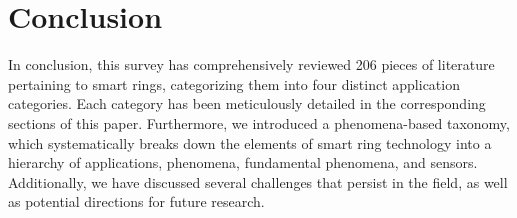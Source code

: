 

\section{Conclusion}
In conclusion, this survey has comprehensively reviewed 206 pieces of literature pertaining to smart rings, categorizing them into four distinct application categories. Each category has been meticulously detailed in the corresponding sections of this paper. Furthermore, we introduced a phenomena-based taxonomy, which systematically breaks down the elements of smart ring technology into a hierarchy of applications, phenomena, fundamental phenomena, and sensors. Additionally, we have discussed several challenges that persist in the field, as well as potential directions for future research.